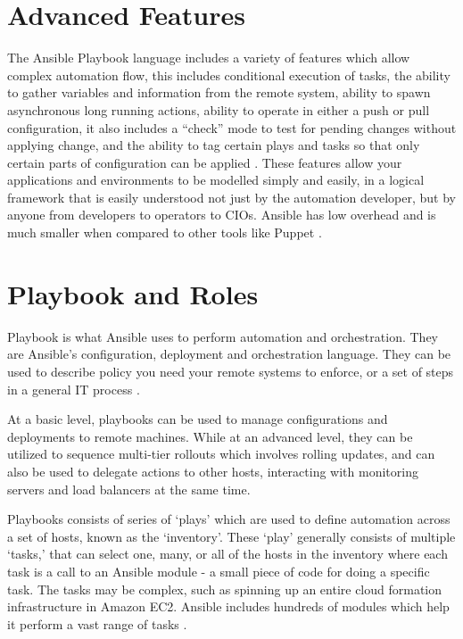 \documentclass[9pt,twocolumn,twoside]{../../styles/osajnl}
\begin{document}
\section{Advanced Features}

The Ansible Playbook language includes a variety of features which
allow complex automation flow, this includes conditional execution of
tasks, the ability to gather variables and information from the remote
system, ability to spawn asynchronous long running actions, ability to
operate in either a push or pull configuration, it also includes a
“check” mode to test for pending changes without applying change, and
the ability to tag certain plays and tasks so that only certain parts
of configuration can be applied \cite{www-ansible3}. These features allow your
applications and environments to be modelled simply and easily, in a
logical framework that is easily understood not just by the automation
developer, but by anyone from developers to operators to CIOs. Ansible
has low overhead and is much smaller when compared to other tools like
Puppet \cite{www-ansible4}.

\section{Playbook and Roles}

Playbook is what Ansible uses to perform automation and
orchestration. They are Ansible's configuration, deployment and
orchestration language. They can be used to describe policy you need
your remote systems to enforce, or a set of steps in a general IT
process \cite{www-ansible5}.

At a basic level, playbooks can be used to manage configurations and
deployments to remote machines. While at an advanced level, they can
be utilized to sequence multi-tier rollouts which involves rolling
updates, and can also be used to delegate actions to other hosts,
interacting with monitoring servers and load balancers at the same time.

Playbooks consists of series of ‘plays’ which are used to define
automation across a set of hosts, known as the ‘inventory’. These
‘play’ generally consists of multiple ‘tasks,’ that can select one,
many, or all of the hosts in the inventory where each task is a call
to an Ansible module - a small piece of code for doing a specific
task. The tasks may be complex, such as spinning up an entire cloud
formation infrastructure in Amazon EC2. Ansible includes hundreds of
modules which help it perform a vast range of
tasks \cite{www-ansible}.
\end{document}

